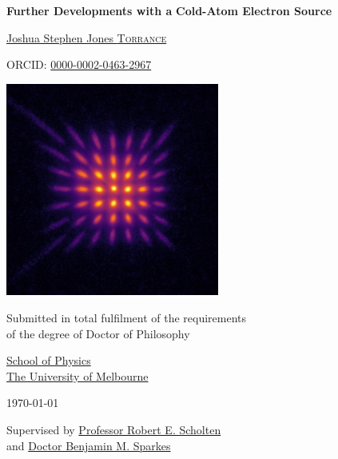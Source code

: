 \begin{titlepage}
    \begin{center}
        \vspace*{1cm}
       
        {\huge\textbf{Further Developments with a}}
       \vspace{0.2cm}
        {\huge\textbf{Cold-Atom Electron Source}}%
	
        \vspace{1.5cm}
        
      \href{https://scholar.google.com.au/citations?user=sLp309oAAAAJ}{{\huge Joshua Stephen Jones \textsc{Torrance}}}

       \vspace{0.4cm}

       ORCID: \href{http://orcid.org/0000-0002-0463-2967}{0000-0002-0463-2967}
        
        \vfill
        
        \includegraphics[width=7cm]{0frontmatter/example_pepperpot_detector_linear.jpeg}
	        
        \vfill
        
        Submitted in total fulfilment of the requirements\\
        of the degree of Doctor of Philosophy

	\vspace{0.8cm}
        
        \href{http://physics.unimelb.edu.au}{School of Physics\\
        The University of Melbourne}\\
        
	\vspace{0.8cm}
	
        \today

	\vspace{0.8cm}

	Supervised by \href{https://scholar.google.com.au/citations?user=F3QFcRYAAAAJ}{Professor Robert E. Scholten}\\ 
	and \href{https://scholar.google.com.au/citations?user=pqsudawAAAAJ}{Doctor Benjamin M. Sparkes}       
    \end{center}
\end{titlepage}
